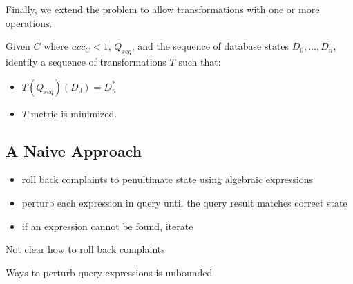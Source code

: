 Finally, we extend the problem to allow transformations with one or more operations.

\begin{problem}\label{prob:multi}
Given $C$ where $acc_C < 1$, $Q_{seq}$, and the sequence of database states $D_0,\ldots,D_n$, 
identify a sequence of transformations $T$ such that:
\begin{itemize}
\item $T(Q_{seq})(D_0) = D^*_n$
\item $T$ metric is minimized.
\end{itemize}
\end{problem}




\subsection{A Naive Approach}

\begin{itemize}
\item roll back complaints to penultimate state using algebraic expressions 
\item perturb each expression in query until the query result matches correct state
\item if an expression cannot be found, iterate
\end{itemize}


Not clear how to roll back complaints

Ways to perturb query expressions is unbounded

